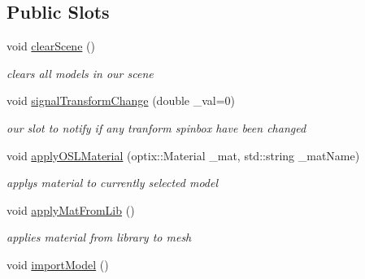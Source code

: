 \subsection*{Public Slots}
\begin{DoxyCompactItemize}
\item 
\hypertarget{class_mesh_widget_a6f5f317f243ea5c06b235af97edf6f49}{void \hyperlink{class_mesh_widget_a6f5f317f243ea5c06b235af97edf6f49}{clear\-Scene} ()}\label{class_mesh_widget_a6f5f317f243ea5c06b235af97edf6f49}

\begin{DoxyCompactList}\small\item\em clears all models in our scene \end{DoxyCompactList}\item 
\hypertarget{class_mesh_widget_ad31fbdeac98ac757b6fc8f1a6dccb197}{void \hyperlink{class_mesh_widget_ad31fbdeac98ac757b6fc8f1a6dccb197}{signal\-Transform\-Change} (double \-\_\-val=0)}\label{class_mesh_widget_ad31fbdeac98ac757b6fc8f1a6dccb197}

\begin{DoxyCompactList}\small\item\em our slot to notify if any tranform spinbox have been changed \end{DoxyCompactList}\item 
\hypertarget{class_mesh_widget_af819cb26a8a0ed4b6aa86fdf6a7c8bc7}{void \hyperlink{class_mesh_widget_af819cb26a8a0ed4b6aa86fdf6a7c8bc7}{apply\-O\-S\-L\-Material} (optix\-::\-Material \-\_\-mat, std\-::string \-\_\-mat\-Name)}\label{class_mesh_widget_af819cb26a8a0ed4b6aa86fdf6a7c8bc7}

\begin{DoxyCompactList}\small\item\em applys material to currently selected model \end{DoxyCompactList}\item 
\hypertarget{class_mesh_widget_aac3bcbbfb389bf17505d4eb894ae5693}{void \hyperlink{class_mesh_widget_aac3bcbbfb389bf17505d4eb894ae5693}{apply\-Mat\-From\-Lib} ()}\label{class_mesh_widget_aac3bcbbfb389bf17505d4eb894ae5693}

\begin{DoxyCompactList}\small\item\em applies material from library to mesh \end{DoxyCompactList}\item 
\hypertarget{class_mesh_widget_a771417b5002a0e5e9cfb32553b7f7544}{void \hyperlink{class_mesh_widget_a771417b5002a0e5e9cfb32553b7f7544}{import\-Model} ()}\label{class_mesh_widget_a771417b5002a0e5e9cfb32553b7f7544}


\end{DoxyCompactItemize}
